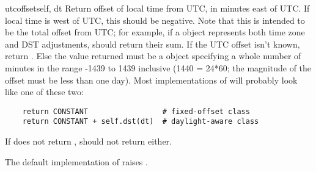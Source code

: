 \begin{methoddesc}{utcoffset}{self, dt}
  Return offset of local time from UTC, in minutes east of UTC.  If
  local time is west of UTC, this should be negative.  Note that this
  is intended to be the total offset from UTC; for example, if a
   object represents both time zone and DST adjustments,
   should return their sum.  If the UTC offset
  isn't known, return .  Else the value returned must be
  a  object specifying a whole number of minutes in the
  range -1439 to 1439 inclusive (1440 = 24*60; the magnitude of the offset
  must be less than one day).  Most implementations of
   will probably look like one of these two:

\begin{verbatim}
    return CONSTANT                 # fixed-offset class
    return CONSTANT + self.dst(dt)  # daylight-aware class
\end{verbatim}

    If  does not return ,
     should not return  either.

    The default implementation of  raises
    .
\end{methoddesc}

